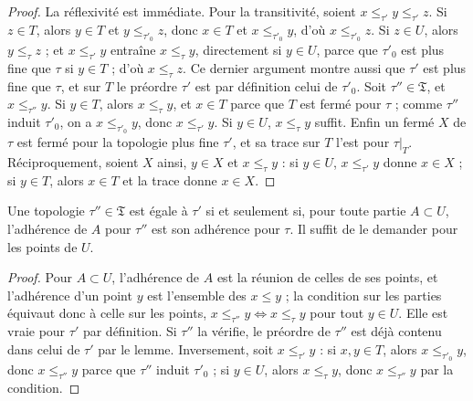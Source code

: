 \begin{proof}
La réflexivité est immédiate. Pour la transitivité, soient $x \leq_{\tau'} y \leq_{\tau'} z$. Si $z \in T$, alors $y \in T$ et $y \leq_{\tau'_0} z$, donc $x \in T$ et $x \leq_{\tau'_0} y$, d'où $x \leq_{\tau'_0} z$. Si $z \in U$, alors $y \leq_\tau z$ ; et $x \leq_{\tau'} y$ entraîne $x \leq_\tau y$, directement si $y \in U$, parce que $\tau'_0$ est plus fine que $\tau$ si $y \in T$ ; d'où $x \leq_\tau z$. Ce dernier argument montre aussi que $\tau'$ est plus fine que $\tau$, et sur $T$ le préordre $\tau'$ est par définition celui de $\tau'_0$. Soit $\tau'' \in \mathfrak T$, et $x \leq_{\tau''} y$. Si $y \in T$, alors $x \leq_\tau y$, et $x \in T$ parce que $T$ est fermé pour $\tau$ ; comme $\tau''$ induit $\tau'_0$, on a $x \leq_{\tau'_0} y$, donc $x \leq_{\tau'} y$. Si $y \in U$, $x \leq_{\tau} y$ suffit. Enfin un fermé $X$ de $\tau$ est fermé pour la topologie plus fine $\tau'$, et sa trace sur $T$ l'est pour $\tau|_T$. Réciproquement, soient $X$ ainsi, $y \in X$ et $x \leq_\tau y$ : si $y \in U$, $x \leq_{\tau'} y$ donne $x \in X$ ; si $y \in T$, alors $x \in T$ et la trace donne $x \in X$.
\end{proof}

\begin{encadre}
\begin{theoreme}
Une topologie $\tau'' \in \mathfrak T$ est égale à $\tau'$ si et seulement si, pour toute partie $A \subset U$, l'adhérence de $A$ pour $\tau''$ est son adhérence pour $\tau$. Il suffit de le demander pour les points de $U$.
\end{theoreme}
\end{encadre}

\begin{proof}
Pour $A \subset U$, l'adhérence de $A$ est la réunion de celles de ses points, et l'adhérence d'un point $y$ est l'ensemble des $x \leq y$ ; la condition sur les parties équivaut donc à celle sur les points, $x \leq_{\tau''} y \Leftrightarrow x \leq_\tau y$ pour tout $y \in U$. Elle est vraie pour $\tau'$ par définition. Si $\tau''$ la vérifie, le préordre de $\tau''$ est déjà contenu dans celui de $\tau'$ par le lemme. Inversement, soit $x \leq_{\tau'} y$ : si $x, y \in T$, alors $x \leq_{\tau'_0} y$, donc $x \leq_{\tau''} y$ parce que $\tau''$ induit $\tau'_0$ ; si $y \in U$, alors $x \leq_\tau y$, donc $x \leq_{\tau''} y$ par la condition.
\end{proof}

\subsection*{}

